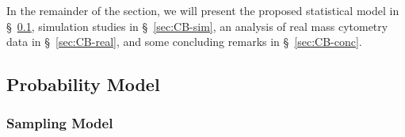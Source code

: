 \documentclass[12pt,]{article}
\begin{document}
In the remainder of the section, we will present the proposed statistical model
in \S~\ref{prob-model}, simulation studies in \S~\ref{sec:CB-sim}, an analysis
of real mass cytometry data in \S~\ref{sec:CB-real}, and some concluding remarks
in \S~\ref{sec:CB-conc}.









\subsection{Probability Model}\label{prob-model}
\subsubsection{Sampling Model} 
\end{document}

